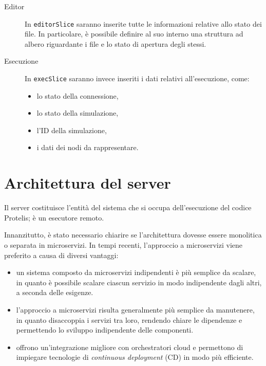       \begin{description}
        \item[Editor]
          In \texttt{editorSlice} saranno inserite tutte le informazioni relative allo stato dei file.
          In particolare, è possibile definire al suo interno una struttura ad albero riguardante i file e lo stato di apertura degli stessi.
        \item[Esecuzione]
          In \texttt{execSlice} saranno invece inseriti i dati relativi all'esecuzione, come:
          \begin{itemize}
            \item lo stato della connessione,
            \item lo stato della simulazione,
            \item l'ID della simulazione,
            \item i dati dei nodi da rappresentare.
          \end{itemize}
      \end{description}


  \section{Architettura del server}\label{sec:arch:server}

    Il server costituisce l'entità del sistema che si occupa dell'esecuzione del codice Protelis; è un esecutore remoto.

    Innanzitutto, è stato necessario chiarire se l'architettura dovesse essere monolitica o separata in microservizi.
    In tempi recenti, l'approccio a microservizi viene preferito a causa di diversi vantaggi:

    \begin{itemize}
      \item
        un sistema composto da microservizi indipendenti è più semplice da scalare,
        in quanto è possibile scalare ciascun servizio in modo indipendente dagli altri, a seconda delle esigenze.
      \item
        l'approccio a microservizi risulta generalmente più semplice da manutenere,
        in quanto disaccoppia i servizi tra loro, rendendo chiare le dipendenze e permettendo lo sviluppo indipendente delle componenti.
      \item
        offrono un'integrazione migliore con orchestratori cloud e permettono di impiegare tecnologie di \emph{continuous deployment} (CD) in modo più efficiente.
    \end{itemize}

